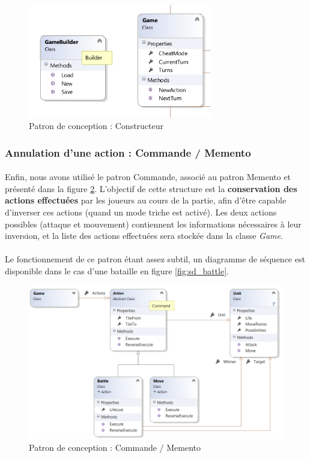 \begin{figure}[h]
  \centering
  \includegraphics[width=8cm]{schemas/dp_builder.png}
  \caption{Patron de conception : Constructeur}
  \label{fig:builder}
\end{figure}

\subsubsection{Annulation d'une action : Commande / Memento}

\paragraph{}
Enfin, nous avons utilisé le patron Commande, associé au patron Memento et présenté dans la figure \ref{fig:command}.
L'objectif de cette structure est la \textbf{conservation des actions effectuées} par les joueurs au cours de la partie, afin d'être capable d'inverser ces actions (quand un mode triche est activé).
Les deux actions possibles (attaque et mouvement) contiennent les informations nécessaires à leur inversion, et la liste des actions effectuées sera stockée dans la classe \emph{Game}.

\paragraph{}
Le fonctionnement de ce patron étant assez subtil, un diagramme de séquence est disponible dans le cas d'une bataille en figure \ref{fig:sd_battle}.

\begin{figure}[h]
  \centering
  \includegraphics[width=13cm]{schemas/dp_command.png}
  \caption{Patron de conception : Commande / Memento}
  \label{fig:command}
\end{figure}

